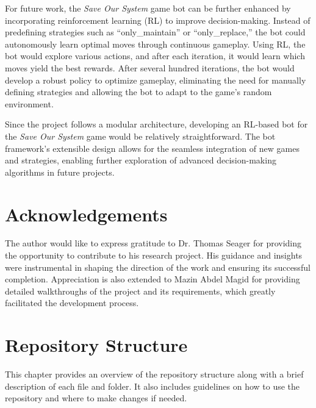 \documentclass[12pt,a4paper]{report}
\begin{document}
        For future work, the \textit{Save Our System} game bot can be further enhanced by incorporating reinforcement learning (RL) to improve decision-making. Instead of predefining strategies such as “only\_maintain” or “only\_replace,” the bot could autonomously learn optimal moves through continuous gameplay. Using RL, the bot would explore various actions, and after each iteration, it would learn which moves yield the best rewards. After several hundred iterations, the bot would develop a robust policy to optimize gameplay, eliminating the need for manually defining strategies and allowing the bot to adapt to the game’s random environment.
        
        Since the project follows a modular architecture, developing an RL-based bot for the \textit{Save Our System} game would be relatively straightforward. The bot framework’s extensible design allows for the seamless integration of new games and strategies, enabling further exploration of advanced decision-making algorithms in future projects.


    \chapter{Acknowledgements}
    \label{chap:acknowledgements}
        
        The author would like to express gratitude to Dr. Thomas Seager for providing the opportunity to contribute to his research project. His guidance and insights were instrumental in shaping the direction of the work and ensuring its successful completion. Appreciation is also extended to Mazin Abdel Magid for providing detailed walkthroughs of the project and its requirements, which greatly facilitated the development process.

    \clearpage

\appendix
    \chapter{Repository Structure}

    This chapter provides an overview of the repository structure along with a brief description of each file and folder. It also includes guidelines on how to use the repository and where to make changes if needed.
\end{document}
